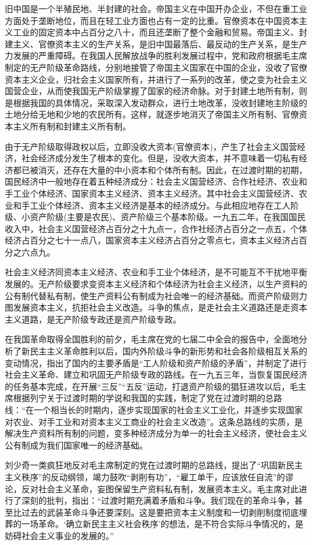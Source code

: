 \documentclass{book}
\begin{document}
旧中国是一个半殖民地、半封建的社会。帝国主义在中国开办企业，不但在重工业方面处于垄断地位，而且在轻工业方面也占有一定的比重。官僚资本在中国资本主义工业的固定资本中占百分之八十，而且还垄断了整个金融和贸易。帝国主义、封建主义、官僚资本主义的生产关系，是旧中国最落后、最反动的生产关系，是生产力发展的严重障碍。在我国人民解放战争的胜利发展过程中，党和政府根据毛主席制定的无产阶级革命路线，分别地接管了帝国主义国家在中国的企业，没收了官僚资本主义企业，归社会主义国家所有，并进行了一系列的改革，使之变为社会主义国营企业，从而使我国无产阶级掌握了国家的经济命脉。对于封建土地所有制，则是根据我国的具体情况，采取深入发动群众，进行土地改革，没收封建地主阶级的土地分给无地和少地的农民所有。这样，就逐步地消灭了帝国主义所有制、官僚资本主义所有制和封建主义所有制。

由于无产阶级取得政权以后，立即没收大资本(官僚资本)，产生了社会主义国营经济，社会经济成分发生了根本的变化。但是，没收大资本，并不意味着一切私有经济都已被消灭，还存在大量的中小资本和个体所有制。因此，在过渡时期的初期，国民经济中一般地存在着五种经济成分：社会主义国营经济、合作社经济、农业和手工业个体经济、国家资本主义经济、资本主义经济。其中社会主义国营经济、农业和手工业个体经济、资本主义经济是基本的经济成分。与此相应地存在工人阶级、小资产阶级(主要是农民)、资产阶级三个基本阶级。一九五二年，在我国国民收入中，社会主义国营经济占百分之十九点一，合作社经济占百分之一点五，个体经济占百分之七十一点八，国家资本主义经济占百分之零点七，资本主义经济占百分之六点九。

社会主义经济同资本主义经济、农业和手工业个体经济，是不可能互不干扰地平衡发展的。无产阶级要求变资本主义经济和个体经济为社会主义经济，以生产资料的公有制代替私有制，使生产资料公有制成为社会唯一的经济基础。而资产阶级则力图发展资本主义，抗拒社会主义改造。斗争的焦点，是走社会主义道路还是走资本主义道路，是无产阶级专政还是资产阶级专政。

在我国革命取得全国胜利的前夕，毛主席在党的七届二中全会的报告中，全面地分析了新民主主义革命胜利以后，国内外阶级斗争的新形势和社会各阶级相互关系的变动情况，指出了国内的主要矛盾是“工人阶级和资产阶级的矛盾”，并制定了进行社会主义革命、建立和巩固无产阶级专政的路线。在一九五三年，当恢复国民经济的任务基本完成，在开展“三反”“五反”运动，打退资产阶级的猖狂进攻以后，毛主席根据列宁关于过渡时期的学说和我国的实践，制定了党在过渡时期的总路线：“在一个相当长的时期内，逐步实现国家的社会主义工业化，并逐步实现国家对农业、对手工业和对资本主义工商业的社会主义改造”。这条总路线的实质，是解决生产资料所有制的问题，变多种经济成分为单一的社会主义经济，使社会主义公有制成为我们国家唯一的经济基础。

刘少奇一类疯狂地反对毛主席制定的党在过渡时期的总路线，提出了“巩固新民主主义秩序”的反动纲领，竭力鼓吹“剥削有功”，“雇工单干，应该放任自流”的谬论，反对社会主义革命，妄图保留生产资料私有制，发展资本主义。毛主席对此进行了深刻的批判，指出：“过渡时期充满着矛盾和斗争。我们现在的革命斗争，甚至比过去的武装革命斗争还要深刻。这是要把资本主义制度和一切剥削制度彻底埋葬的一场革命。‘确立新民主主义社会秩序’的想法，是不符合实际斗争情况的，是妨碍社会主义事业的发展的。”
\end{document}
